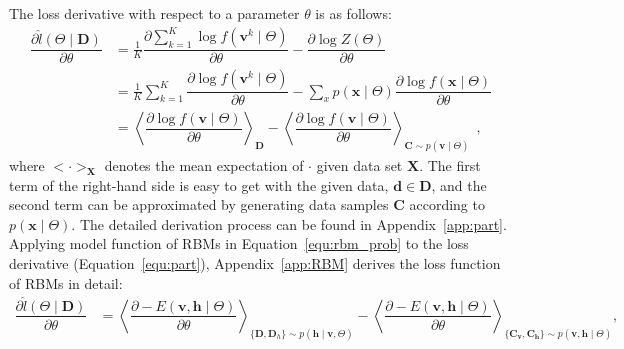 The loss derivative with respect to a parameter $\theta$ is as follows:
\begin{equation}
\label{equ:part}
\begin{aligned}
\dfrac{\partial \hat{l} (\Theta \mid \mathbf{D})}{\partial \theta} 
& = \frac{1}{K} \dfrac{\partial \sum_{k=1}^K\log f(\mathbf{v}^k \mid \Theta )}{\partial \theta} - \dfrac{\partial \log Z( \Theta)}{\partial \theta}\\
& =  \frac{1}{K}\sum_{k=1}^K \dfrac{\partial \log f(\mathbf{v}^k \mid \Theta)}{\partial \theta} - \sum_x p(\mathbf{x} \mid \Theta) \dfrac{\partial \log f(\mathbf{x} \mid \Theta)}{\partial \theta}\\
& = \left \langle \dfrac{\partial \log f(\mathbf{v} \mid \Theta)}{\partial \theta}\right \rangle_{\mathbf{D}} -\left \langle \dfrac{\partial \log f(\mathbf{v} \mid \Theta)}{\partial \theta}\right \rangle_{\mathbf{C} \sim p(\mathbf{v} \mid \Theta)} ~~,
\end{aligned}
\end{equation}
where  $ <\cdot>_{\mathbf{X}} $ denotes the mean expectation of $ \cdot $ given data set $\mathbf{X}$.
The first term of the right-hand side is easy to get with the given data, $\mathbf{d} \in \mathbf{D} $, and the second term can be approximated by generating data samples $\mathbf{C} $ according to $ p(\mathbf{x} \mid \Theta) $.
The detailed derivation process can be found in Appendix~\ref{app:part}.
Applying model function of RBMs in Equation~\ref{equ:rbm_prob} to the loss derivative (Equation~\ref{equ:part}), Appendix~\ref{app:RBM} derives the loss function of RBMs in detail:
\begin{equation}
\label{equ:RBM}
\begin{aligned}
\dfrac{\partial \hat{l} (\Theta \mid \mathbf{D})}{\partial \theta} 
& = \left \langle \dfrac{\partial -E(\mathbf{v}, \mathbf{h} \mid \Theta)}{\partial \theta} \right \rangle_{\{\mathbf{D}, \mathbf{D}_h\} \sim p( \mathbf{h} \mid \mathbf{v}, \Theta)} 
- \left \langle \dfrac{\partial -E(\mathbf{v}, \mathbf{h} \mid \Theta)}{\partial \theta} \right \rangle_{\{\mathbf{C_v}, \mathbf{C_h}\} \sim p( \mathbf{v}, \mathbf{h} \mid  \Theta)},  \\
\end{aligned}
\end{equation}
